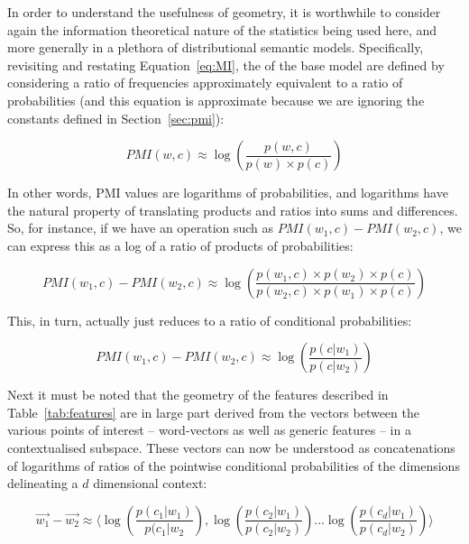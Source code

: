 In order to understand the usefulness of geometry, it is worthwhile to consider again the information theoretical nature of the statistics being used here, and more generally in a plethora of distributional semantic models.  Specifically, revisiting and restating Equation~\ref{eq:MI}, the  of the base model are defined by considering a ratio of frequencies approximately equivalent to a ratio of probabilities (and this equation is approximate because we are ignoring the constants defined in Section~\ref{sec:pmi}):

\begin{equation}
PMI(w,c) \approx \log\left(\frac{p(w,c)}{p(w) \times p(c)}\right)
\end{equation}

\noindent In other words, PMI values are logarithms of probabilities, and logarithms have the natural property of translating products and ratios into sums and differences.  So, for instance, if we have an operation such as $PMI(w_1,c)-PMI(w_2,c)$, we can express this as a log of a ratio of products of probabilities:

\begin{equation}
PMI(w_1,c)-PMI(w_2,c) \approx \log\left(\frac{p(w_1,c) \times p(w_2) \times p(c)}{p(w_2,c) \times p(w_1) \times p(c)} \right)
\end{equation}

\noindent This, in turn, actually just reduces to a ratio of conditional probabilities:

\begin{equation} \label{eq:logdif}
PMI(w_1,c)-PMI(w_2,c) \approx \log\left(\frac{p(c|w_1)}{p(c|w_2)}\right)
\end{equation}

\noindent Next it must be noted that the geometry of the features described in Table~\ref{tab:features} are in large part derived from the vectors between the various points of interest -- word-vectors as well as generic features -- in a contextualised subspace.  These vectors can now be understood as concatenations of logarithms of ratios of the pointwise conditional probabilities of the dimensions delineating a $d$ dimensional context:

\begin{equation}
\overrightarrow{w_1}-\overrightarrow{w_2} \approx \Bigg\langle \log\left(\frac{p(c_1|w_1)}{p(c_1|w_2}\right), \log\left(\frac{p(c_2|w_1)}{p(c_2|w_2)}\right)... \log\left(\frac{p(c_d|w_1)}{p(c_d|w_2)}\right)\Bigg\rangle
\end{equation}

